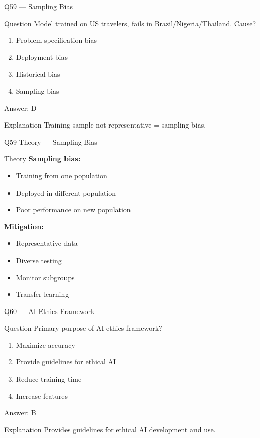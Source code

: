 \documentclass[aspectratio=169,8pt]{beamer}
\begin{document}
	\begin{frame}{Q59 --- Sampling Bias}
		\begin{block}{Question}
			Model trained on US travelers, fails in Brazil/Nigeria/Thailand. Cause?
		\end{block}
		\begin{enumerate}[label=\Alph*.]
			\item Problem specification bias
			\item Deployment bias
			\item Historical bias
			\item Sampling bias
		\end{enumerate}
		\begin{exampleblock}{Answer: D}
		\end{exampleblock}
		\begin{block}{Explanation}
			Training sample not representative = sampling bias.
		\end{block}
	\end{frame}
	
	\begin{frame}{Q59 Theory --- Sampling Bias}
		\begin{block}{Theory}
			\textbf{Sampling bias:}
			\begin{itemize}
				\item Training from one population
				\item Deployed in different population
				\item Poor performance on new population
			\end{itemize}
			\textbf{Mitigation:}
			\begin{itemize}
				\item Representative data
				\item Diverse testing
				\item Monitor subgroups
				\item Transfer learning
			\end{itemize}
		\end{block}
	\end{frame}
	
	\begin{frame}{Q60 --- AI Ethics Framework}
		\begin{block}{Question}
			Primary purpose of AI ethics framework?
		\end{block}
		\begin{enumerate}[label=\Alph*.]
			\item Maximize accuracy
			\item Provide guidelines for ethical AI
			\item Reduce training time
			\item Increase features
		\end{enumerate}
		\begin{exampleblock}{Answer: B}
		\end{exampleblock}
		\begin{block}{Explanation}
			Provides guidelines for ethical AI development and use.
		\end{block}
	\end{frame}
	
\end{document}
